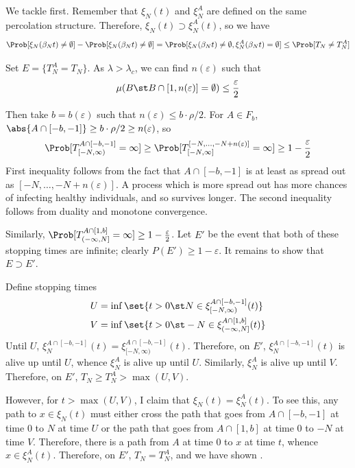 \documentclass{scrartcl}
\newcommand{\ep}{\varepsilon}
\begin{document}
We tackle  first. Remember that $\xi_{N}(t)$ and $\xi_{N}^{A}$ are defined on the same percolation structure. Therefore, $\xi_{N}(t) \supset \xi_{N}^{A}(t)$, so we have
\[ \Prob[\xi_{N}(\beta_{N} t) \neq \emptyset] - \Prob[\xi_{N}(\beta_{N} t) \neq \emptyset] = \Prob[\xi_{N}(\beta_{N} t) \neq \emptyset, \xi_{N}^{A}(\beta_{N} t) = \emptyset] \leq \Prob[T_{N} \neq T_{N}^{A}] \]
%

Set $E = \{T^A_N = T_N\}$. As $\lambda > \lambda_{c}$, we can find $n(\ep)$ such that
\[ \mu(B \st B \cap [1,n(\ep)] = \emptyset) \leq \frac{\ep}{2} \]

Then take $b = b(\ep)$ such that $n(\ep) \leq b \cdot \rho/2$. For $A \in F_{b}$, $\abs{A \cap [-b,-1]} \geq b \cdot \rho/2 \geq n(\ep)$, so
\[ \Prob[T_{[-N,\infty)}^{A \cap [-b,-1]} = \infty] \geq \Prob[T_{[-N,\infty]}^{[-N,\ldots,-N+n(\ep)]} = \infty] \geq 1 - \frac{\ep}{2} \]
First inequality follows from the fact that $A \cap [-b,-1]$ is at least as spread out as $[-N,\ldots,-N+n(\ep)]$. A process which is more spread out has more chances of infecting 
healthy individuals, and so survives longer.
The second inequality follows from duality and monotone convergence.

Similarly, $\Prob[T_{(-\infty,N]}^{A \cap [1,b]} = \infty] \geq 1 - \frac{\ep}{2}$. Let $E'$ be the event that both of these stopping times are infinite; clearly $P(E') \geq 1 - \ep$. It remains to show that $E \supset E'$.

Define stopping times
\begin{align*}
  U &= \inf\set{t > 0 \st N \in \xi_{[-N,\infty)}^{A \cap [-b,-1]}(t)} \\
  V &= \inf\set{t > 0 \st -N \in \xi_{(-\infty,N]}^{A \cap [1,b]}(t)}
\end{align*}
Until $U$, $\xi_{N}^{A \cap [-b,-1]}(t) = \xi_{[-N,\infty)}^{A \cap [-b,-1]}(t)$. Therefore, on $E'$, $\xi_{N}^{A \cap [-b,-1]}(t)$ is alive up until $U$, whence $\xi_{N}^{A}$ is alive up until $U$. Similarly, $\xi_{N}^{A}$ is alive up until $V$. Therefore, on $E'$, $T_{N} \geq T_{N}^{A} > \max(U,V)$.

However, for $t > \max(U,V)$, I claim that $\xi_{N}(t) = \xi_{N}^{A}(t)$. To see this, any path to $x \in \xi_{N}(t)$ must either cross the path that goes from $A \cap [-b,-1]$ at time $0$ to $N$ at time $U$ or the path that goes from $A \cap [1,b]$ at time $0$ to $-N$ at time $V$. Therefore, there is a path from $A$ at time $0$ to $x$ at time $t$, whence $x \in \xi_{N}^{A}(t)$. Therefore, on $E'$, $T_{N} = T_{N}^{A}$, and we have shown .
\end{document}
